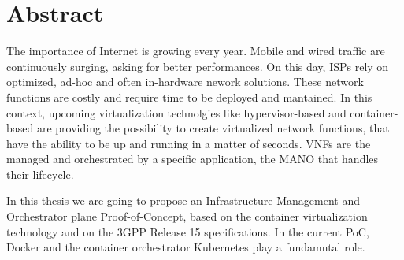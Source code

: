 \cleardoublepage
{}

\thispagestyle{empty}

\newenvironment{changemargin}[2]{%
\begin{list}{}{%
\setlength{\topsep}{0pt}%
\setlength{\leftmargin}{#1}%
\setlength{\rightmargin}{#2}%
\setlength{\listparindent}{\parindent}%
\setlength{\itemindent}{\parindent}%
\setlength{\parsep}{\parskip}%
}%
\item[]}{\end{list}}

\vspace*{\fill}
\begin{changemargin}{1.5cm}{1.5cm}
\section*{Abstract}
The importance of Internet is growing every year. Mobile and wired traffic are
continuously surging, asking for better performances. On this day, ISPs rely on
optimized, ad-hoc and often in-hardware nework solutions. These network
functions are costly and require time to be deployed and mantained. In this
context, upcoming virtualization technolgies like hypervisor-based and
container-based are providing the possibility to create virtualized network
functions, that have the ability to be up and running in a matter of seconds.
VNFs are the managed and orchestrated by a specific application, the MANO that
handles their lifecycle.

In this thesis we are going to propose an Infrastructure Management and
Orchestrator plane Proof-of-Concept, based on the container virtualization
technology and on the 3GPP Release 15 specifications. In the current PoC, Docker
and the container orchestrator Kubernetes play a fundamntal role.
\vspace*{\fill}
\end{changemargin}
